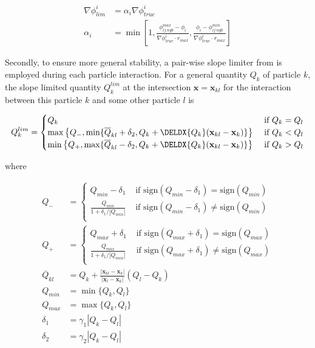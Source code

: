 \begin{align}
	\nabla \phi_{lim}^i &= \alpha_i \nabla \phi^i_{true} \label{eq:cell-limiter-first}\\
	\alpha_i &= \min\left[ 1, \frac{\phi_{ij\ ngb}^{max} - \phi_i}{\nabla \phi^i_{true} \cdot
r_{max}}, \frac{\phi_i - \phi_{ij\ ngb}^{min}}{\nabla \phi^i_{true} \cdot r_{max}} \right]
\label{eq:cell-limiter-last}
\end{align}


Secondly, to ensure more general stability, a pair-wise slope limiter from
\cite{hopkinsGIZMONewClass2015} is employed during each particle interaction.
For a general quantity $Q_k$ of particle $k$, the slope limited quantity $Q_k^{lim}$ at the
intersection $\mathbf{x} = \mathbf{x}_{kl}$ for the interaction between this particle $k$ and some
other particle $l$ is

\begin{equation}
	Q_k^{lim} =
	\begin{cases}
		Q_k
						& \text{ if } Q_k = Q_l \\
		\max\left\{ Q_-,
			\min\{ \overline{Q}_{kl} + \delta_2, Q_k + \DELDX{Q_k} (\mathbf{x}_{kl} - 
\mathbf{x}_k)\}
		\right\}
						& \text{ if } Q_k < Q_l \\
		\min\left\{ Q_+,
			\max\{ \overline{Q}_{kl} - \delta_2, Q_k + \DELDX{Q_k} (\mathbf{x}_{kl} -
\mathbf{x}_k)\}
		\right\}
						& \text{ if } Q_k > Q_l
	\end{cases}  \label{eq:face-limiter-first}
\end{equation}


where


\begin{align}
Q_- &=
	\begin{cases}
		Q_{min} - \delta_1
						& \text{ if } \mathrm{sign} (Q_{min} - \delta_1) = \mathrm{sign} (Q_{min})\\
		\frac{Q_{min}}{1 + \delta_1 / | Q_{min}|}
						& \text{ if } \mathrm{sign} (Q_{min} - \delta_1) \neq \mathrm{sign} 
(Q_{min}) \\
	\end{cases}\\
%
Q_+ &=
	\begin{cases}
		Q_{max} + \delta_1
						& \text{ if } \mathrm{sign} (Q_{max} + \delta_1) = \mathrm{sign} (Q_{max}) 
\\
		\frac{Q_{max}}{1 + \delta_1 / | Q_{min}|}
						& \text{ if } \mathrm{sign} (Q_{max} + \delta_1) \neq \mathrm{sign} 
(Q_{max}) \\
	\end{cases}\\
%
\overline{Q}_{kl} &=
	Q_k + \frac{|\mathbf{x}_{kl} - \mathbf{x}_{k}|}{|\mathbf{x}_{l} - \mathbf{x}_{k}|} (Q_l -
Q_k)\\
%
Q_{min} &= \min\{ Q_k, Q_l \} \\
Q_{max} &= \max\{ Q_k, Q_l \} \\
\delta_1 &= \gamma_1 | Q_k - Q_l | \\
\delta_2 &= \gamma_2 | Q_k - Q_l |  \label{eq:face-limiter-last}
\end{align}

